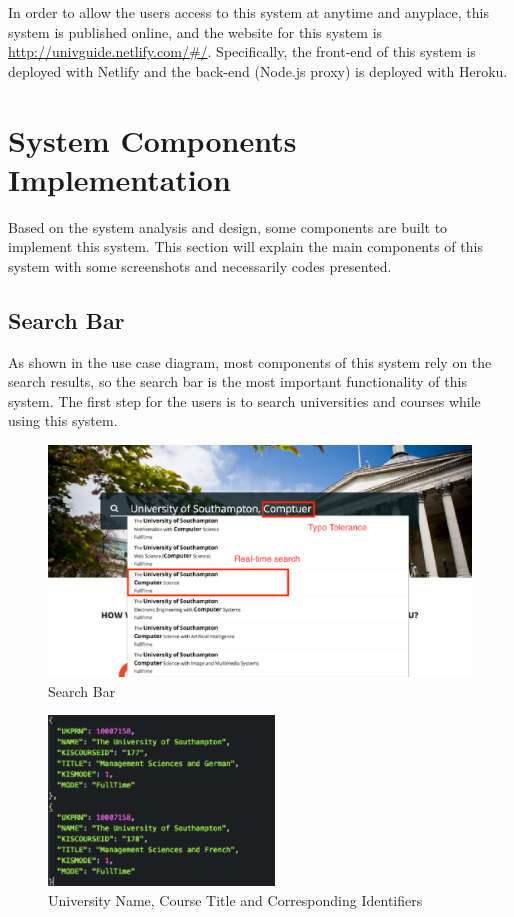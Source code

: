 In order to allow the users access to this system at anytime and anyplace, this system is published online, and the website for this system is \href{http://univguide.netlify.com/#/}{http://univguide.netlify.com/\#/}. Specifically, the front-end of this system is deployed with Netlify and the back-end (Node.js proxy) is deployed with Heroku.


\section{System Components Implementation}

Based on the system analysis and design, some components are built to implement this system. This section will explain the main components of this system with some screenshots and necessarily codes presented. 


\subsection{Search Bar
}	
As shown in the use case diagram, most components of this system rely on the search results, so the search bar is the most important functionality of this system. The first step for the users is to search universities and courses while using this system. 

\begin{figure}[H]
  \centering
  \includegraphics[width=15cm]{./img/Picture16}
  \caption{Search Bar}
  \label{Figure:figex}
\end{figure}

\begin{figure}[H]
  \centering
  \includegraphics[width=6cm]{./img/Picture17}
  \caption{University Name, Course Title and Corresponding Identifiers
}
  \label{Figure:figex}
\end{figure}

